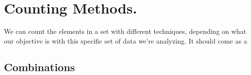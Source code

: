 \documentclass[11pt,fleqn]{book} %
\begin{document}
\chapter{Counting Methods.}

We can count the elements in a set with different techniques, depending on what our objective is with this 
specific set of data we're analyzing. It should come as a 
\section{Combinations}







\end{document}

